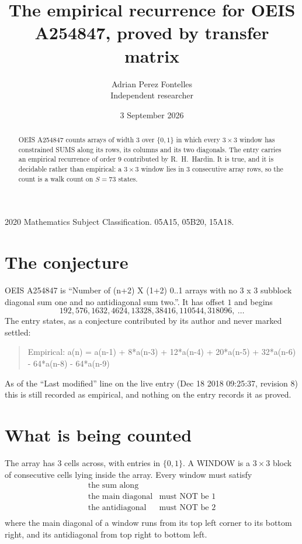 \documentclass[11pt,a4paper]{article}
\title{The empirical recurrence for OEIS A254847, proved by transfer matrix}
\author{Adrian Perez Fontelles\\ \small Independent researcher}
\date{3 September 2026}
\theoremstyle{plain}
\theoremstyle{definition}
\begin{document}
\maketitle

\begin{abstract}
OEIS A254847 counts arrays of width $3$ over $\{0,1\}$ in which every $3\times3$ window has
constrained SUMS along its rows, its columns and its two diagonals. The entry carries an
empirical recurrence of order $9$ contributed by R.~H.~Hardin. It is true, and it is
decidable rather than empirical: a $3\times3$ window lies in $3$ consecutive array rows,
so the count is a walk count on $S=73$ states.
\end{abstract}

\noindent\small 2020 Mathematics Subject Classification. 05A15, 05B20, 15A18.\normalsize

\section{The conjecture}

OEIS A254847 is ``Number of (n+2) X (1+2) 0..1 arrays with no 3 x 3 subblock diagonal sum one and no antidiagonal sum two.''. It has offset $1$ and begins
\[
192, 576, 1632, 4624, 13328, 38416, 110544, 318096,\ \dots
\]
The entry states, as a conjecture contributed by its author and never marked settled:
\begin{quote}
Empirical: a(n) = a(n-1) + 8*a(n-3) + 12*a(n-4) + 20*a(n-5) + 32*a(n-6) - 64*a(n-8) - 64*a(n-9)
\end{quote}
As of the ``Last modified'' line on the live entry (Dec 18 2018 09:25:37, revision 8) this is still
recorded as empirical, and nothing on the entry records it as proved.

\section{What is being counted}

The array has $3$ cells across, with entries in $\{0,1\}$. A WINDOW is a $3\times3$ block
of consecutive cells lying inside the array. Every window must satisfy
\[
\begin{array}{ll}
\text{the sum along} & \text{} \\[2pt]
\text{the main diagonal} & \text{must NOT be 1} \\
\text{the antidiagonal} & \text{must NOT be 2} \\
\end{array}
\]
where the main diagonal of a window runs from its top left corner to its bottom right, and its
antidiagonal from top right to bottom left.
\end{document}

